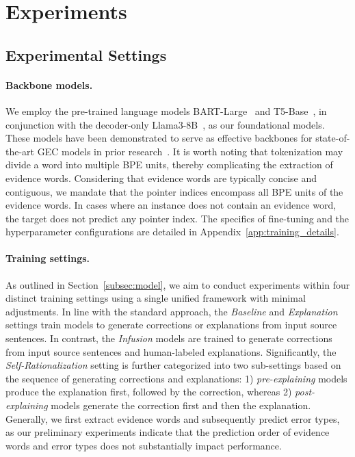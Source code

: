 \section{Experiments}
\label{sec:experiments}

\subsection{Experimental Settings}
\paragraph{Backbone models.} We employ the pre-trained language models BART-Large~\citep{lewis-etal-2020-bart} and T5-Base~\citep{raffel2020exploring}, in conjunction with the decoder-only Llama3-8B~\citep{dubey2024llama}, as our foundational models. These models have been demonstrated to serve as effective backbones for state-of-the-art GEC models in prior research~\citep{ye-etal-2023-mixedit,zhang-etal-2023-bidirectional,wang-etal-2024-improving-grammatical}. It is worth noting that tokenization may divide a word into multiple BPE units, thereby complicating the extraction of evidence words. Considering that evidence words are typically concise and contiguous, we mandate that the pointer indices encompass all BPE units of the evidence words. In cases where an instance does not contain an evidence word, the target does not predict any pointer index. The specifics of fine-tuning and the hyperparameter configurations are detailed in Appendix~\ref{app:training_details}.


\paragraph{Training settings.}
As outlined in Section~\ref{subsec:model}, we aim to conduct experiments within four distinct training settings using a single unified framework with minimal adjustments. In line with the standard approach, the \textit{Baseline} and \textit{Explanation} settings train models to generate corrections or explanations from input source sentences. In contrast, the \textit{Infusion} models are trained to generate corrections from input source sentences and human-labeled explanations. Significantly, the \textit{Self-Rationalization} setting is further categorized into two sub-settings based on the sequence of generating corrections and explanations: 
1) \textit{pre-explaining} models produce the explanation first, followed by the correction, whereas 2) \textit{post-explaining} models generate the correction first and then the explanation. Generally, we first extract evidence words and subsequently predict error types, as our preliminary experiments indicate that the prediction order of evidence words and error types does not substantially impact performance.


